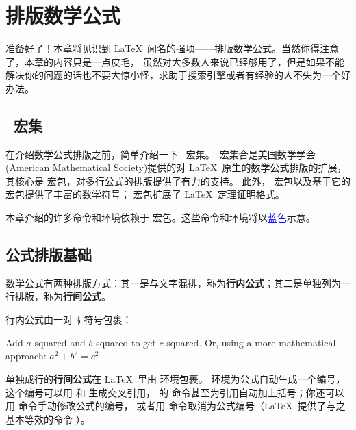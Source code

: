 \chapter{排版数学公式}
\begin{intro}
准备好了！本章将见识到 \LaTeX\ 闻名的强项——排版数学公式。当然你得注意了，本章的内容只是一点皮毛，
虽然对大多数人来说已经够用了，但是如果不能解决你的问题的话也不要大惊小怪，求助于搜索引擎或者有经验的人不失为一个好办法。
\end{intro}
\DeclareRobustCommand*\amscmd[1]{\textcolor{blue}{\cmd{#1}}}
\DeclareRobustCommand*\amsenv[1]{\textcolor{blue}{\env{#1}}}

\section{\AmS\ 宏集}\label{sec:ams-bundle}

在介绍数学公式排版之前，简单介绍一下 \AmS\ 宏集。\AmS\ 宏集合是美国数学学会(American Mathematical Society)提供的对
\LaTeX\ 原生的数学公式排版的扩展，其核心是  宏包，对多行公式的排版提供了有力的支持。
此外， 宏包以及基于它的  宏包提供了丰富的数学符号； 宏包扩展了 \LaTeX\ 定理证明格式。

本章介绍的许多命令和环境依赖于  宏包。这些命令和环境将以\textcolor{blue}{蓝色}示意。

\section{公式排版基础}\label{sec:math-basics}

数学公式有两种排版方式：其一是与文字混排，称为\textbf{行内公式}；其二是单独列为一行排版，称为\textbf{行间公式}。

行内公式由一对 \texttt\$ 符号包裹：
\begin{example}
Add $a$ squared and $b$ squared
to get $c$ squared. Or, using
a more mathematical approach:
$a^2 + b^2 = c^2$
\end{example}

单独成行的\textbf{行间公式}在 \LaTeX\ 里由  环境包裹。
 环境为公式自动生成一个编号，这个编号可以用  和  生成交叉引用，
 的 \amscmd{eqref} 命令甚至为引用自动加上括号；你还可以用 \amscmd{tag} 命令手动修改公式的编号，
或者用 \amscmd{notag} 命令取消为公式编号（\LaTeX\ 提供了与之基本等效的命令 ）。

